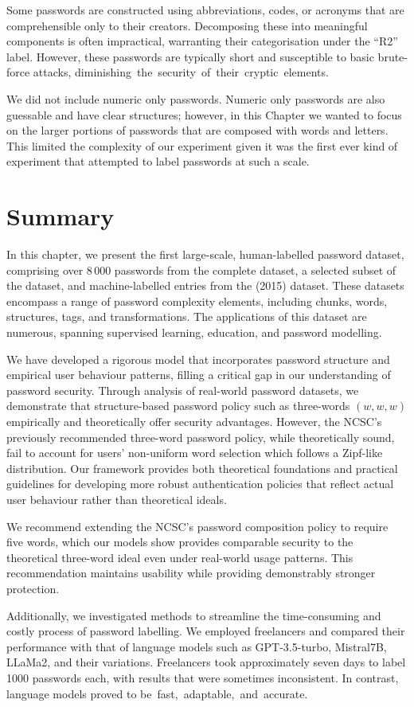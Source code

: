 Some passwords are constructed using abbreviations, codes, or acronyms that are comprehensible only to their creators. Decomposing these into meaningful components is often impractical, warranting their categorisation under the ``R2'' label. However, these passwords are typically short and susceptible to basic brute-force attacks, diminishing~the~security~of~their~cryptic~elements.

We did not include numeric only passwords. Numeric only passwords are also guessable and have clear structures; however, in this Chapter we wanted to focus on the larger portions of passwords that are composed with words and letters. This limited the complexity of our experiment given it was the first ever kind of experiment that attempted to label passwords at such a scale.

\section{Summary}
In this chapter, we present the first large-scale, human-labelled password dataset, comprising over 8\,000 passwords from the complete \hmail dataset, a selected subset of the \phpbb dataset, and machine-labelled entries from the \lizardsquad (2015) dataset. These datasets encompass a range of password complexity elements, including chunks, words, structures, tags, and transformations. The applications of this dataset are numerous, spanning supervised learning, education, and password modelling.

We have developed a rigorous model that incorporates password structure and empirical user behaviour patterns, filling a critical gap in our understanding of password security. Through analysis of real-world password datasets, we demonstrate that structure-based password policy such as three-words $(w,w,w)$ empirically and theoretically offer security advantages. However, the NCSC's previously recommended three-word password policy, while theoretically sound, fail to account for users' non-uniform word selection which follows a Zipf-like distribution. Our framework provides both theoretical foundations and practical guidelines for developing more robust authentication policies that reflect actual user behaviour rather than theoretical ideals.

We recommend extending the NCSC's password composition policy to require five words, which our models show provides comparable security to the theoretical three-word ideal even under real-world usage patterns. This recommendation maintains usability while providing demonstrably stronger protection.

Additionally, we investigated methods to streamline the time-consuming and costly process of password labelling. We employed freelancers and compared their performance with that of language models such as GPT-3.5-turbo, Mistral7B, LLaMa2, and their variations. Freelancers took approximately seven days to label \num{1000} passwords each, with results that were sometimes inconsistent. In contrast, language models proved to be~fast,~adaptable,~and~accurate.
